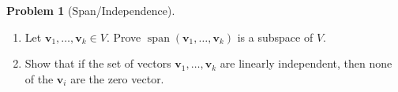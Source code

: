 \documentclass[12pt]{article}
\theoremstyle{definition}
\newtheorem{problem}{Problem}
\renewcommand{\vec}{\mathbf}
\begin{document}
\begin{problem}[Span/Independence]~
\begin{enumerate}
\item Let $\vec{v}_1, \ldots, \vec{v}_k \in V$. Prove $\operatorname{span}(\vec{v}_1, \ldots, \vec{v}_k)$ is a subspace of $V$.
\item Show that if the set of vectors $\vec{v}_1, \ldots, \vec{v}_k$ are linearly independent, then none of the $\vec{v}_i$ are the zero vector.
\end{enumerate}
\end{problem}
\end{document}
